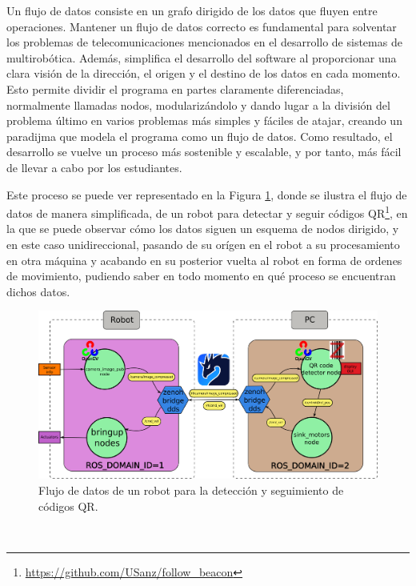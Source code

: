 Un flujo de datos consiste en un grafo dirigido de los datos que fluyen entre
operaciones.
Mantener un flujo de datos correcto es fundamental para solventar los problemas
de telecomunicaciones mencionados en el desarrollo de sistemas de multirobótica.
Además, simplifica el desarrollo del software al proporcionar una clara visión
de la dirección, el origen y el destino de los datos en cada momento.
Esto permite dividir el programa en partes claramente diferenciadas, normalmente
llamadas nodos, modularizándolo y dando lugar a la división del problema último
en varios problemas más simples y fáciles de atajar, creando un paradijma que
modela el programa como un flujo de datos.
Como resultado, el desarrollo se vuelve un proceso más sostenible y escalable, y
por tanto, más fácil de llevar a cabo por los estudiantes.

Este proceso se puede ver representado en la Figura
\ref{fig:data_flow_qr_example}, donde se ilustra el flujo de datos de manera
simplificada, de un robot para detectar y seguir códigos
QR\footnote{\url{https://github.com/USanz/follow_beacon}}, en la que se puede
observar cómo los datos siguen un esquema de nodos dirigido, y en este caso
unidireccional, pasando de su orígen en el robot a su procesamiento en otra
máquina y acabando en su posterior vuelta al robot en forma de ordenes de
movimiento, pudiendo saber en todo momento en qué proceso se encuentran dichos
datos.

\begin{figure} [h!]
  \begin{center}
    \includegraphics[width=15cm]{figs/QR_code_data_flow}
  \end{center}
  \caption{Flujo de datos de un robot para la detección y seguimiento de códigos QR.}
  \label{fig:data_flow_qr_example}
\end{figure}\

